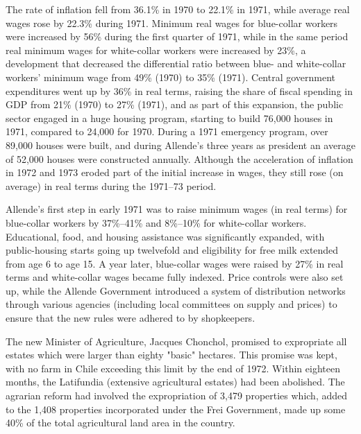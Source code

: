 The rate of inflation fell from 36.1\% in 1970 to 22.1\% in 1971, while
average real wages rose by 22.3\% during 1971. Minimum real wages for
blue-collar workers were increased by 56\% during the first quarter of
1971, while in the same period real minimum wages for white-collar
workers were increased by 23\%, a development that decreased the
differential ratio between blue- and white-collar workers' minimum wage
from 49\% (1970) to 35\% (1971). Central government expenditures went up
by 36\% in real terms, raising the share of fiscal spending in GDP from
21\% (1970) to 27\% (1971), and as part of this expansion, the public
sector engaged in a huge housing program, starting to build 76,000
houses in 1971, compared to 24,000 for 1970. During a 1971 emergency
program, over 89,000 houses were built, and during Allende's three years
as president an average of 52,000 houses were constructed annually.
Although the acceleration of inflation in 1972 and 1973 eroded part of
the initial increase in wages, they still rose (on average) in real
terms during the 1971--73 period.

Allende's first step in early 1971 was to raise minimum wages (in real
terms) for blue-collar workers by 37\%--41\% and 8\%--10\% for
white-collar workers. Educational, food, and housing assistance was
significantly expanded, with public-housing starts going up twelvefold
and eligibility for free milk extended from age 6 to age 15. A year
later, blue-collar wages were raised by 27\% in real terms and
white-collar wages became fully indexed. Price controls were also set
up, while the Allende Government introduced a system of distribution
networks through various agencies (including local committees on supply
and prices) to ensure that the new rules were adhered to by shopkeepers.

The new Minister of Agriculture, Jacques Chonchol, promised to
expropriate all estates which were larger than eighty "basic" hectares.
This promise was kept, with no farm in Chile exceeding this limit by the
end of 1972. Within eighteen months, the Latifundia (extensive
agricultural estates) had been abolished. The agrarian reform had
involved the expropriation of 3,479 properties which, added to the 1,408
properties incorporated under the Frei Government, made up some 40\% of
the total agricultural land area in the country.

